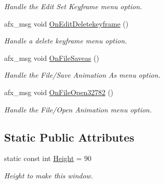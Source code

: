 \begin{DoxyCompactItemize}
\begin{DoxyCompactList}\small\item\em Handle the Edit Set Keyframe menu option. \end{DoxyCompactList}\item 
\hypertarget{class_c_view_timeline_ab3eccb4a5bcd5ffa60442359b86e0597}{afx\+\_\+msg void \hyperlink{class_c_view_timeline_ab3eccb4a5bcd5ffa60442359b86e0597}{On\+Edit\+Deletekeyframe} ()}\label{class_c_view_timeline_ab3eccb4a5bcd5ffa60442359b86e0597}

\begin{DoxyCompactList}\small\item\em Handle a delete keyframe menu option. \end{DoxyCompactList}\item 
\hypertarget{class_c_view_timeline_a647b850c229507b28682d6b24e25e53c}{afx\+\_\+msg void \hyperlink{class_c_view_timeline_a647b850c229507b28682d6b24e25e53c}{On\+File\+Saveas} ()}\label{class_c_view_timeline_a647b850c229507b28682d6b24e25e53c}

\begin{DoxyCompactList}\small\item\em Handle the File/\+Save Animation As menu option. \end{DoxyCompactList}\item 
\hypertarget{class_c_view_timeline_a0679334f0c5d934467d14a831b768627}{afx\+\_\+msg void \hyperlink{class_c_view_timeline_a0679334f0c5d934467d14a831b768627}{On\+File\+Open32782} ()}\label{class_c_view_timeline_a0679334f0c5d934467d14a831b768627}

\begin{DoxyCompactList}\small\item\em Handle the File/\+Open Animation menu option. \end{DoxyCompactList}\end{DoxyCompactItemize}
\subsection*{Static Public Attributes}
\begin{DoxyCompactItemize}
\item 
\hypertarget{class_c_view_timeline_a6634479092090825e8c392902cf6c685}{static const int \hyperlink{class_c_view_timeline_a6634479092090825e8c392902cf6c685}{Height} = 90}\label{class_c_view_timeline_a6634479092090825e8c392902cf6c685}

\begin{DoxyCompactList}\small\item\em Height to make this window. \end{DoxyCompactList}\end{DoxyCompactItemize}
